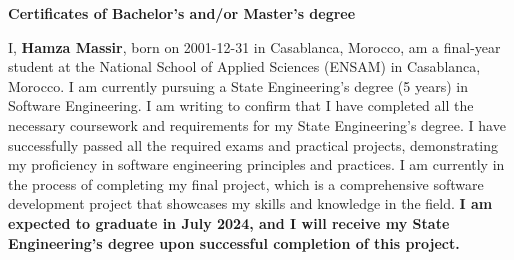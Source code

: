 \documentclass[12pt,a4paper]{article}
\begin{document}
\begin{center}
    \Large \textbf{Certificates of Bachelor's and/or Master's degree }
\end{center}

\vspace{1cm}

\noindent
I, \textbf{Hamza Massir}, born on 2001-12-31 in Casablanca, Morocco, am a final-year student at the National School of Applied Sciences (ENSAM) in Casablanca, Morocco. I am currently pursuing a State Engineering's degree (5 years) in Software Engineering.
I am writing to confirm that I have completed all the necessary coursework and requirements for my State Engineering's degree. I have successfully passed all the required exams and practical projects, demonstrating my proficiency in software engineering principles and practices.
I am currently in the process of completing my final project, which is a comprehensive software development project that showcases my skills and knowledge in the field. \textbf{I am expected to graduate in July 2024, and I will receive my State Engineering's degree upon successful completion of this project.}
\end{document}
